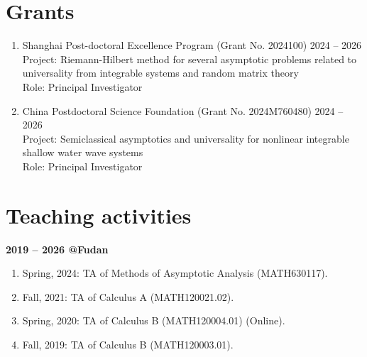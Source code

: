 \documentclass[margin]{res}
\begin{document}
\begin{resume}
\section{Grants}
\begin{enumerate}[--]
\item Shanghai Post-doctoral Excellence Program (Grant No. 2024100) \hfill 2024 -- 2026  \\
Project: Riemann-Hilbert method for several asymptotic problems related to universality from integrable systems and random matrix theory  \\
Role: Principal Investigator

\item China Postdoctoral Science Foundation (Grant No. 2024M760480)  \hfill 2024 -- 2026\\
Project: Semiclassical asymptotics and universality for nonlinear integrable shallow water wave systems \\
Role: Principal Investigator
\end{enumerate}



\section{Teaching activities}
\textbf{2019 -- 2026 @Fudan}
\begin{enumerate}[--]
\item Spring, 2024: TA of Methods of Asymptotic Analysis (MATH630117).
\item Fall, 2021: TA of Calculus A (MATH120021.02).
\item Spring, 2020: TA of Calculus B (MATH120004.01) (Online).
\item Fall, 2019: TA of Calculus B (MATH120003.01).
\end{enumerate}



\end{resume}
\end{document}
